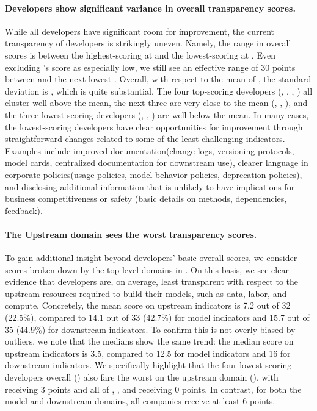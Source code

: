 \paragraph{Developers show significant variance in overall transparency scores.}
While all developers have significant room for improvement, the current transparency of developers is strikingly uneven. 
Namely, the range in overall scores is \scorerange between the highest-scoring \meta at \maxscore and the lowest-scoring \amazon at \minscore.
Even excluding \amazon's score as especially low, we still see an effective range of 30 points between \meta and the next lowest \inflection.
Overall, with respect to the mean of \meanscore, the standard deviation is \stdev, which is quite substantial.
The four top-scoring developers (\meta, \huggingface, \openai, \stability) all cluster well above the mean, the next three are very close to the mean (\google, \anthropic, \cohere), and the three lowest-scoring developers (\aitwentyone, \inflection, \amazon) are well below the mean.
In many cases, the lowest-scoring developers have clear opportunities for improvement through straightforward changes related to some of the least challenging indicators. 
Examples include improved documentation(\eg change logs, versioning protocols, model cards, centralized documentation for downstream use), clearer language in corporate policies(\eg usage policies, model behavior policies, deprecation policies), and disclosing additional information that is unlikely to have implications for business competitiveness or safety (\eg basic details on methods, dependencies, feedback).

\paragraph{The Upstream domain sees the worst transparency scores.}
To gain additional insight beyond developers' basic overall scores, we consider scores broken down by the \numdomains top-level domains in .
On this basis, we see clear evidence that developers are, on average, least transparent with respect to the upstream resources required to build their models, such as data, labor, and compute. 
Concretely, the mean score on upstream indicators is 7.2 out of 32 (22.5\%), compared to 14.1 out of 33 (42.7\%) for model indicators and 15.7 out of 35 (44.9\%) for downstream indicators.
To confirm this is not overly biased by outliers, we note that the medians show the same trend: the median score on upstream indicators is 3.5, compared to 12.5 for model indicators and 16 for downstream indicators.
We specifically highlight that the four lowest-scoring developers overall () also fare the worst on the upstream domain (), with \cohere receiving 3 points and all of \aitwentyone, \inflection, and \amazon receiving 0 points.
In contrast, for both the model and downstream domains, all \numcompanies companies receive at least 6 points. 

